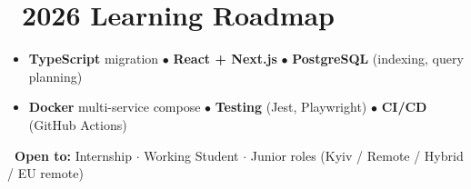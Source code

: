 \documentclass[10pt,a4paper,sans]{moderncv}
\begin{document}
\section{\faRoad\ 2026 Learning Roadmap}
\begin{itemize}
    \item[\faChevronRight] \small \textbf{TypeScript} migration $\bullet$ \textbf{React + Next.js} $\bullet$ \textbf{PostgreSQL} (indexing, query planning)
    \item[\faChevronRight] \small \textbf{Docker} multi-service compose $\bullet$ \textbf{Testing} (Jest, Playwright) $\bullet$ \textbf{CI/CD} (GitHub Actions)
\end{itemize}

\vspace{0.3em}
\small\textbf{\faPaperPlane\ Open to:} Internship $\cdot$ Working Student $\cdot$ Junior roles \quad (Kyiv / Remote / Hybrid / EU remote)
\end{document}
